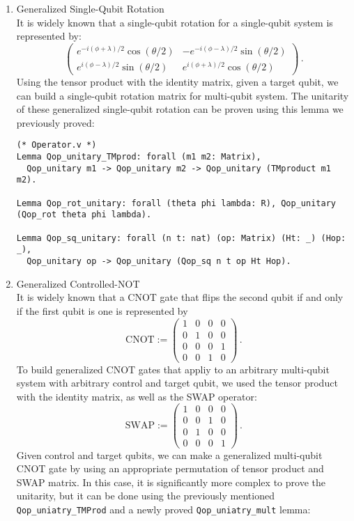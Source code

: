 \documentclass[10pt,a4paper]{article}
\newcommand{\<}{\langle}
\renewcommand{\>}{\rangle}
\newcommand{\prths}[1]{\left( #1 \right)}
\begin{document}
\begin{enumerate}
  \item Generalized Single-Qubit Rotation \\
    It is widely known that a single-qubit rotation for a single-qubit system is
    represented by:
    $$
      \begin{pmatrix}
        e^{-i \prths{\phi + \lambda}/2} \cos \prths{\theta / 2} &
       -e^{-i \prths{\phi - \lambda}/2} \sin \prths{\theta / 2} \\
        e^{ i \prths{\phi - \lambda}/2} \sin \prths{\theta / 2} &
        e^{ i \prths{\phi + \lambda}/2} \cos \prths{\theta / 2}
      \end{pmatrix} \, .
    $$
    Using the tensor product with the identity matrix, given a target qubit, we can
    build a single-qubit rotation matrix for multi-qubit system.
    The unitarity of these generalized single-qubit rotation can be proven using
    this lemma we previously proved:

\begin{lstlisting}
(* Operator.v *)
Lemma Qop_unitary_TMprod: forall (m1 m2: Matrix),
  Qop_unitary m1 -> Qop_unitary m2 -> Qop_unitary (TMproduct m1 m2).

Lemma Qop_rot_unitary: forall (theta phi lambda: R), Qop_unitary (Qop_rot theta phi lambda).

Lemma Qop_sq_unitary: forall (n t: nat) (op: Matrix) (Ht: _) (Hop: _),
  Qop_unitary op -> Qop_unitary (Qop_sq n t op Ht Hop).
\end{lstlisting}

  \item Generalized Controlled-NOT \\
    It is widely known that a CNOT gate that flips the second qubit if and only if
    the first qubit is one is represented by
    $$
    \textrm{CNOT} :=
      \begin{pmatrix}
        1 & 0 & 0 & 0 \\
        0 & 1 & 0 & 0 \\
        0 & 0 & 0 & 1 \\
        0 & 0 & 1 & 0
      \end{pmatrix} \, .
    $$
    To build generalized CNOT gates that appliy to an arbitrary multi-qubit
    system with arbitrary control and target qubit, we used the tensor product
    with the identity matrix, as well as the SWAP operator:
    $$
    \textrm{SWAP} :=
      \begin{pmatrix}
        1 & 0 & 0 & 0 \\
        0 & 0 & 1 & 0 \\
        0 & 1 & 0 & 0 \\
        0 & 0 & 0 & 1
      \end{pmatrix} \, .
    $$
    Given control and target qubits, we can make a generalized multi-qubit CNOT
    gate by using an appropriate permutation of tensor product and SWAP matrix.
    In this case, it is significantly more complex to prove the unitarity, but it can
    be done using the previously mentioned \texttt{Qop\_uniatry\_TMProd} and a
    newly proved \texttt{Qop\_uniatry\_mult} lemma:


\end{enumerate}
\end{document}
